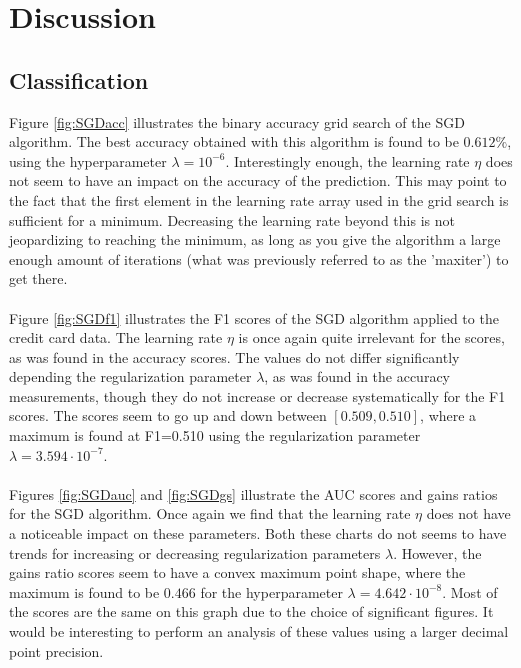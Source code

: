 \section{Discussion}
    \subsection{Classification}
        Figure \ref{fig:SGDacc} illustrates the binary accuracy grid search of the SGD algorithm. The best accuracy obtained with this algorithm is found to be $0.612\%$, using the hyperparameter $\lambda = 10^{-6}$. Interestingly enough, the learning rate $\eta$ does not seem to have an impact on the accuracy of the prediction. This may point to the fact that the first element in the learning rate array used in the grid search is sufficient for a minimum. Decreasing the learning rate beyond this is not jeopardizing to reaching the minimum, as long as you give the algorithm a large enough amount of iterations (what was previously referred to as the 'maxiter') to get there.\\\\
        Figure \ref{fig:SGDf1} illustrates the F1 scores of the SGD algorithm applied to the credit card data. The learning rate $\eta$ is once again quite irrelevant for the scores, as was found in the accuracy scores. The values do not differ significantly depending the regularization parameter $\lambda$, as was found in the accuracy measurements, though they do not increase or decrease systematically for the F1 scores. The scores seem to go up and down between $[0.509, 0.510]$, where a maximum is found at F1=0.510 using the regularization parameter $\lambda=3.594\cdot10^{-7}$.\\\\
        Figures \ref{fig:SGDauc} and \ref{fig:SGDgs} illustrate the AUC scores and gains ratios for the SGD algorithm. Once again we find that the learning rate $\eta$ does not have a noticeable impact on these parameters. Both these charts do not seems to have trends for increasing or decreasing regularization parameters $\lambda$. However, the gains ratio scores seem to have a convex maximum point shape, where the maximum is found to be $0.466$ for the hyperparameter $\lambda=4.642\cdot 10^{-8}$. Most of the scores are the same on this graph due to the choice of significant figures. It would be interesting to perform an analysis of these values using a larger decimal point precision.\\\\
